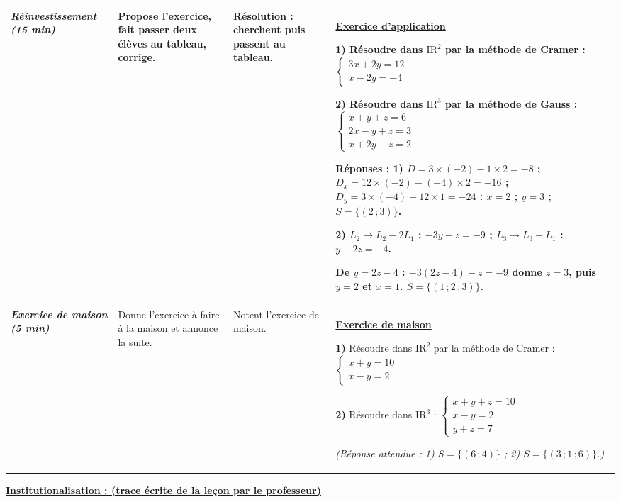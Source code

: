 \documentclass[10pt]{article}
\newcommand{\titreR}[1]{\underline{\textcolor{rougetitre}{\bfseries #1}}}
\newcommand{\app}{\titreR{Exercice d'application}}
\newcommand{\maison}{\underline{\textcolor{rougemaison}{\bfseries Exercice de maison}}}
\newcommand{\moment}[1]{\textbf{\itshape #1}}
\newcommand{\Rd}[1]{\mathrm{IR}^{#1}}   %
\begin{document}
\begin{longtable}{|p{2.35cm}|p{5.35cm}|p{4.55cm}|p{13.85cm}|}
\moment{Ré\-in\-ves\-tis\-se\-ment (15 min)} &
Propose l'exercice, fait passer deux élèves au tableau, corrige. &
\textbf{Résolution} : cherchent puis passent au tableau. &
\app \par
\textbf{1)} Résoudre dans $\Rd{2}$ par la méthode de Cramer : \;
$\left\{\begin{array}{l}3x+2y=12 \\ x-2y=-4\end{array}\right.$ \par
\textbf{2)} Résoudre dans $\Rd{3}$ par la méthode de Gauss : \;
$\left\{\begin{array}{l}x+y+z=6 \\ 2x-y+z=3 \\ x+2y-z=2\end{array}\right.$ \par
\textbf{Réponses :} \textbf{1)} $D=3\times(-2)-1\times2=-8$ ;
$D_x=12\times(-2)-(-4)\times2=-16$ ; $D_y=3\times(-4)-12\times1=-24$ : \;
$x=2$ ; $y=3$ ; $S=\{(2\,;3)\}$. \par
\textbf{2)} $L_2 \to L_2-2L_1$ : $-3y-z=-9$ ; \; $L_3 \to L_3-L_1$ : $y-2z=-4$. \par
De $y=2z-4$ : $-3(2z-4)-z=-9$ donne $z=3$, puis $y=2$ et $x=1$. \;
$S=\{(1\,;2\,;3)\}$. \\ \hline

\moment{Exercice de maison (5 min)} &
Donne l'exercice à faire à la maison et annonce la suite. &
Notent l'exercice de maison. &
\maison \par
\textbf{1)} Résoudre dans $\Rd{2}$ par la méthode de Cramer : \;
$\left\{\begin{array}{l}x+y=10 \\ x-y=2\end{array}\right.$ \par
\textbf{2)} Résoudre dans $\Rd{3}$ : \;
$\left\{\begin{array}{l}x+y+z=10 \\ x-y=2 \\ y+z=7\end{array}\right.$ \par
\textit{(Réponse attendue : 1) $S=\{(6\,;4)\}$ ; 2) $S=\{(3\,;1\,;6)\}$.)} \\ \hline
\end{longtable}

\begin{center}
\underline{\textcolor{rougetitre}{\large\bfseries Institutionalisation \; : \; (trace écrite de la leçon par le professeur)}}
\end{center}
\end{document}
